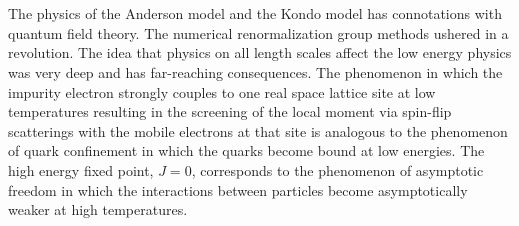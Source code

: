 \documentclass[twoside,11pt]{report}
\numberwithin{equation}{section}
\begin{document}
\\\\ The physics of the Anderson model and the Kondo model has connotations with quantum field theory. The numerical renormalization group methods ushered in a revolution. The idea that physics on all length scales affect the low energy physics was very deep and has far-reaching consequences. The phenomenon in which the impurity electron strongly couples to one real space lattice site at low temperatures resulting in the screening of the local moment via spin-flip scatterings with the mobile electrons at that site is analogous to the phenomenon of quark confinement in which the quarks become bound at low energies. The high energy fixed point, \(J=0\), corresponds to the phenomenon of asymptotic freedom in which the interactions between particles become asymptotically weaker at high temperatures.
\end{document}
